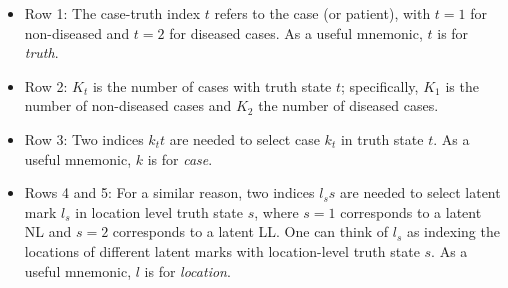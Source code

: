 \documentclass[
]{book}
\begin{document}
\begin{itemize}
\item
  Row 1: The case-truth index \(t\) refers to the case (or patient), with \(t = 1\) for non-diseased and \(t = 2\) for diseased cases. As a useful mnemonic, \(t\) is for \emph{truth}.
\item
  Row 2: \(K_t\) is the number of cases with truth state \(t\); specifically, \(K_1\) is the number of non-diseased cases and \(K_2\) the number of diseased cases.
\item
  Row 3: Two indices \(k_t t\) are needed to select case \(k_t\) in truth state \(t\). As a useful mnemonic, \(k\) is for \emph{case}.
\item
  Rows 4 and 5: For a similar reason, two indices \(l_s s\) are needed to select latent mark \(l_s\) in location level truth state \(s\), where \(s = 1\) corresponds to a latent NL and \(s = 2\) corresponds to a latent LL. One can think of \(l_s\) as indexing the locations of different latent marks with location-level truth state \(s\). As a useful mnemonic, \(l\) is for \emph{location}.


\end{itemize}
\end{document}
